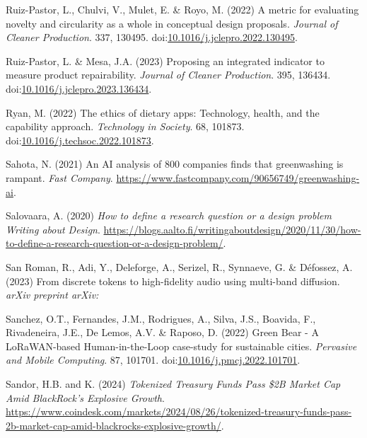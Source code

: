 \documentclass[
  letterpaper,
  DIV=11,
  numbers=noendperiod]{scrartcl}
\newlength{\cslhangindent}
\newenvironment{CSLReferences}[2] %
 {\begin{list}{}{%
  \setlength{\itemindent}{0pt}
  \setlength{\leftmargin}{0pt}
  \setlength{\parsep}{0pt}
  \ifodd #1
   \setlength{\leftmargin}{\cslhangindent}
   \setlength{\itemindent}{-1\cslhangindent}
  \fi
  \setlength{\itemsep}{#2\baselineskip}}}
 {\end{list}}
\begin{document}
\begin{CSLReferences}{0}{1}
Ruiz-Pastor, L., Chulvi, V., Mulet, E. \& Royo, M. (2022) A metric for
evaluating novelty and circularity as a whole in conceptual design
proposals. \emph{Journal of Cleaner Production}. 337, 130495.
doi:\href{https://doi.org/10.1016/j.jclepro.2022.130495}{10.1016/j.jclepro.2022.130495}.

Ruiz-Pastor, L. \& Mesa, J.A. (2023) Proposing an integrated indicator
to measure product repairability. \emph{Journal of Cleaner Production}.
395, 136434.
doi:\href{https://doi.org/10.1016/j.jclepro.2023.136434}{10.1016/j.jclepro.2023.136434}.

Ryan, M. (2022) The ethics of dietary apps: {Technology}, health, and
the capability approach. \emph{Technology in Society}. 68, 101873.
doi:\href{https://doi.org/10.1016/j.techsoc.2022.101873}{10.1016/j.techsoc.2022.101873}.

Sahota, N. (2021) An {AI} analysis of 800 companies finds that
greenwashing is rampant. \emph{Fast Company}.
\url{https://www.fastcompany.com/90656749/greenwashing-ai}.

Salovaara, A. (2020) \emph{How to define a research question or a design
problem {\textbar} {Writing} about {Design}}.
\url{https://blogs.aalto.fi/writingaboutdesign/2020/11/30/how-to-define-a-research-question-or-a-design-problem/}.

San Roman, R., Adi, Y., Deleforge, A., Serizel, R., Synnaeve, G. \&
Défossez, A. (2023) From discrete tokens to high-fidelity audio using
multi-band diffusion. \emph{arXiv preprint arXiv:}

Sanchez, O.T., Fernandes, J.M., Rodrigues, A., Silva, J.S., Boavida, F.,
Rivadeneira, J.E., De Lemos, A.V. \& Raposo, D. (2022) Green {Bear} - {A
LoRaWAN-based Human-in-the-Loop} case-study for sustainable cities.
\emph{Pervasive and Mobile Computing}. 87, 101701.
doi:\href{https://doi.org/10.1016/j.pmcj.2022.101701}{10.1016/j.pmcj.2022.101701}.

Sandor, H.B. and K. (2024) \emph{Tokenized {Treasury Funds Pass} \${2B
Market Cap Amid BlackRock}'s {Explosive Growth}}.
\url{https://www.coindesk.com/markets/2024/08/26/tokenized-treasury-funds-pass-2b-market-cap-amid-blackrocks-explosive-growth/}.


\end{CSLReferences}
\end{document}
